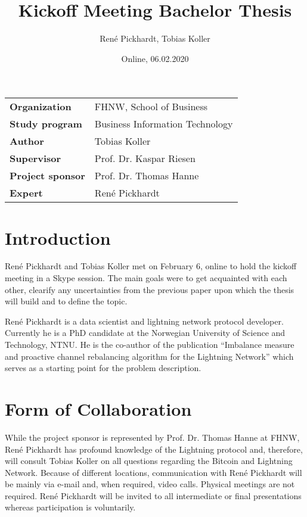 \documentclass[final]{fhnwreport}       %
\title{Kickoff Meeting Bachelor Thesis}          %
\author{René Pickhardt, Tobias Koller}          %
\date{Online, 06.02.2020}             %
\begin{document}
\maketitle

\vspace*{-1cm}						    %
\vfill

{
\renewcommand\arraystretch{2}
\begin{center}
\begin{tabular}{>{\bf}p{4cm} l}
Organization                  &    FHNW, School of Business\\
Study program                 &    Business Information Technology\\
Author   	                  &    Tobias Koller\\
Supervisor                    &    Prof. Dr. Kaspar Riesen\\
Project sponsor               &    Prof. Dr. Thomas Hanne\\
Expert                        &    René Pickhardt
\end{tabular}
\end{center}
}
\clearpage

\section{Introduction}
René Pickhardt and Tobias Koller met on February 6, online to hold the kickoff meeting in a Skype session. The main goals were to get acquainted with each other, clearify any uncertainties from the previous paper upon which the thesis will build and to define the topic.

René Pickhardt is a data scientist and lightning network protocol developer. Currently he is a PhD candidate at the Norwegian University of Science and Technology, NTNU. He is the co-author of the publication ``Imbalance measure and proactive channel rebalancing algorithm for the Lightning Network'' which serves as a starting point for the problem description.

\section{Form of Collaboration}
While the project sponsor is represented by Prof. Dr. Thomas Hanne at FHNW, René Pickhardt has profound knowledge of the Lightning protocol and, therefore,  will consult Tobias Koller on all questions regarding the Bitcoin and Lightning Network. Because of different locations, communication with René Pickhardt will be mainly via e-mail and, when required, video calls. Physical meetings are not required. René Pickhardt will be invited to all intermediate or final presentations whereas participation is voluntarily.
\end{document}

